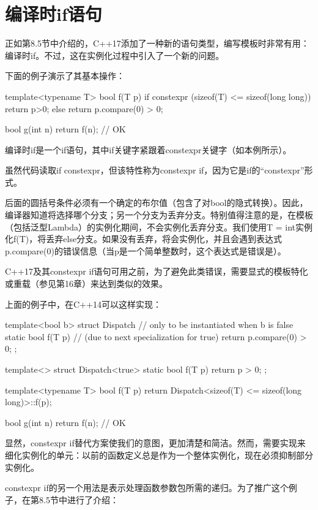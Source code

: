 \section{编译时if语句}
正如第8.5节中介绍的，C++17添加了一种新的语句类型，编写模板时非常有用：编译时if。不过，这在实例化过程中引入了一个新的问题。

下面的例子演示了其基本操作：

\begin{cpp}
template<typename T> bool f(T p) {
	if constexpr (sizeof(T) <= sizeof(long long)) {
		return p>0;
	} else {
		return p.compare(0) > 0;
	}
}

bool g(int n) {
	return f(n); // OK
}
\end{cpp}

编译时if是一个if语句，其中if关键字紧跟着constexpr关键字（如本例所示）。

\begin{notice}
虽然代码读取if constexpr，但该特性称为constexpr if，因为它是if的“constexpr”形式。
\end{notice}

后面的圆括号条件必须有一个确定的布尔值（包含了对bool的隐式转换）。因此，编译器知道将选择哪个分支；另一个分支为丢弃分支。特别值得注意的是，在模板（包括泛型Lambda）的实例化期间，不会实例化丢弃分支。我们使用T = int实例化f(T)，将丢弃else分支。如果没有丢弃，将会实例化，并且会遇到表达式p.compare(0)的错误信息（当p是一个简单整数时，这个表达式是错误是）。

C++17及其constexpr if语句可用之前，为了避免此类错误，需要显式的模板特化或重载（参见第16章）来达到类似的效果。

上面的例子中，在C++14可以这样实现：

\begin{cpp}
template<bool b> struct Dispatch { // only to be instantiated when b is false
	static bool f(T p) { // (due to next specialization for true)
		return p.compare(0) > 0;
	}
};

template<> struct Dispatch<true> {
	static bool f(T p) {
		return p > 0;
	}
};

template<typename T> bool f(T p) {
	return Dispatch<sizeof(T) <= sizeof(long long)>::f(p);
}

bool g(int n) {
	return f(n); // OK
}
\end{cpp}

显然，constexpr if替代方案使我们的意图，更加清楚和简洁。然而，需要实现来细化实例化的单元：以前的函数定义总是作为一个整体实例化，现在必须抑制部分实例化。

constexpr if的另一个用法是表示处理函数参数包所需的递归。为了推广这个例子，在第8.5节中进行了介绍：

